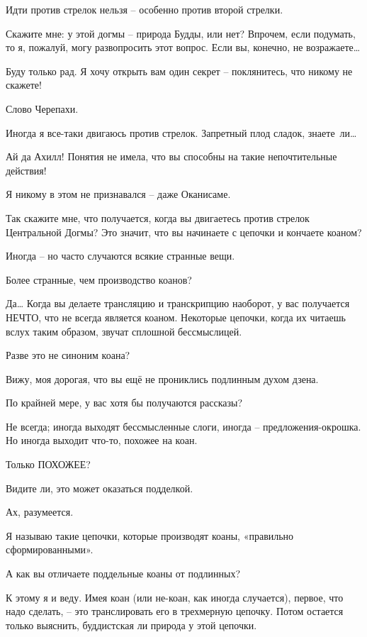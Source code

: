 \documentclass[../main.tex]{subfiles}
\begin{document}
\begin{dialogue}
Идти против стрелок нельзя \--- особенно против второй стрелки.

 Скажите мне: у этой догмы \--- природа Будды, или нет? Впрочем, если подумать, то я, пожалуй, могу развопросить этот вопрос. Если вы, конечно, не возражаете\ldots{}

 Буду только рад. Я хочу открыть вам один секрет \--- поклянитесь, что никому не скажете!

 Слово Черепахи.

 Иногда я все-таки двигаюсь против стрелок. Запретный плод сладок, знаете~ли\ldots{}

 Ай да Ахилл! Понятия не имела, что вы способны на такие непочтительные действия!

 Я никому в этом не признавался \--- даже Оканисаме.

 Так скажите мне, что получается, когда вы двигаетесь против стрелок Центральной Догмы? Это значит, что вы начинаете с цепочки и кончаете коаном?

 Иногда \--- но часто случаются всякие странные вещи.

 Более странные, чем производство коанов?

 Да\ldots{} Когда вы делаете трансляцию и транскрипцию наоборот, у вас получается НЕЧТО, что не всегда является коаном. Некоторые цепочки, когда их читаешь вслух таким образом, звучат сплошной бессмыслицей.

 Разве это не синоним коана?

 Вижу, моя дорогая, что вы ещё не прониклись подлинным духом дзена.

 По крайней мере, у вас хотя бы получаются рассказы?

 Не всегда; иногда выходят бессмысленные слоги, иногда \--- предложения-окрошка. Но иногда выходит что-то, похожее на коан.

 Только ПОХОЖЕЕ?

 Видите ли, это может оказаться подделкой.

 Ах, разумеется.

 Я называю такие цепочки, которые производят коаны, «правильно сформированными».

 А как вы отличаете поддельные коаны от подлинных?

 К этому я и веду. Имея коан (или не-коан, как иногда случается), первое, что надо сделать, \--- это транслировать его в трехмерную цепочку. Потом остается только выяснить, буддистская ли природа у этой цепочки.


\end{dialogue}
\end{document}
